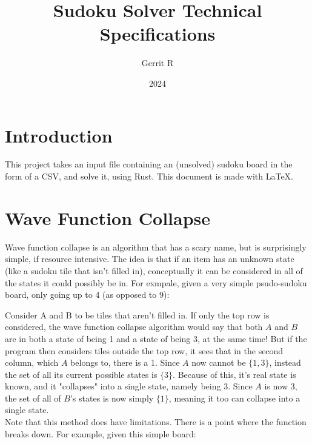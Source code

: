 \documentclass[11pt]{article}
\author{Gerrit R}
\title{Sudoku Solver Technical Specifications}
\date{2024}
\begin{document}
\maketitle
\section{Introduction}
This project takes an input file containing an 
(unsolved) sudoku board in the form of a CSV, and solve it, using Rust. This document is made with \LaTeX.

\section{Wave Function Collapse}
Wave function collapse is an algorithm that has a scary name, but 
is surprisingly simple, if resource intensive. The idea is that if 
an item has an unknown state (like a sudoku tile that isn't filled in), 
conceptually it can be considered in all of the states it could possibly be in.
For exmpale, given a very simple psudo-sudoku board, only going up to 4 (as opposed to 9):\\
\begin{center}
\end{center}
Consider A and B to be tiles that aren't filled in. If only the top row is considered, the wave
function collapse algorithm would say that both $A$ and $B$ are in both a state of being 1 
and a state of being 3, at the same time! But if the program then considers tiles outside the top row,
it sees that in the second column, which $A$ belongs to, there is a 1. Since $A$ now cannot be $\{1, 3\}$, 
instead the set of all its current possible states is $\{3\}$. Because of this, it's real state is known, and it 
"collapses" into a single state, namely being 3. Since $A$ is now 3, the set of all of $B$'s states is now simply
$\{1\}$, meaning it too can collapse into a single state. \\
Note that this method does have limitations. There is a point where the function breaks down. For example, given this simple board:
\end{document}
